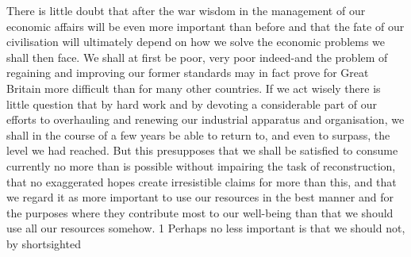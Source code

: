 \documentclass[11pt,openany]{book}
\begin{document}
\begin{center}\textasteriskcentered\hspace{0.9em}\textasteriskcentered\hspace{0.9em}\textasteriskcentered\end{center}

\begin{center}\textasteriskcentered\hspace{0.9em}\textasteriskcentered\hspace{0.9em}\textasteriskcentered\end{center}

\begin{center}\textasteriskcentered\hspace{0.9em}\textasteriskcentered\hspace{0.9em}\textasteriskcentered\end{center}

\begin{center}\textasteriskcentered\hspace{0.9em}\textasteriskcentered\hspace{0.9em}\textasteriskcentered\end{center}

\begin{center}\textasteriskcentered\hspace{0.9em}\textasteriskcentered\hspace{0.9em}\textasteriskcentered\end{center}

There is little doubt that after the war wisdom in the management of our economic affairs will be even more important than before and that the fate of our civilisation will ultimately depend on how we solve the economic problems we shall then face. We shall at first be poor, very poor indeed-and the problem of regaining and improving our former standards may in fact prove for Great Britain more difficult than for many other countries. If we act wisely there is little question that by hard work and by devoting a considerable part of our efforts to overhauling and renewing our industrial apparatus and organisation, we shall in the course of a few years be able to return to, and even to surpass, the level we had reached. But this presupposes that we shall be satisfied to consume currently no more than is possible without impairing the task of reconstruction, that no exaggerated hopes create irresistible claims for more than this, and that we regard it as more important to use our resources in the best manner and for the purposes where they contribute most to our well-being than that we should use all our resources somehow. 1 Perhaps no less important is that we should not, by shortsighted
\end{document}
